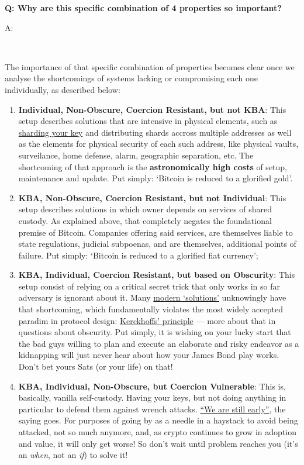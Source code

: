 \documentclass[12pt,a4paper]{article}
\newenvironment{question}[1]{%
  \vspace{0.8em}\noindent\textbf{Q: #1}\par
  \vspace{0.2em}\noindent\begin{itshape}A:\end{itshape}~%
}{\vspace{0.8em}}
\begin{document}
\begin{question}{Why are this specific combination of 4 properties so important?}
 The importance of that specific combination of properties becomes clear once we analyse the shortcomings of systems lacking or compromising each one individually, as described below:
 \begin{enumerate}
  \item \textbf{Individual, Non-Obscure, Coercion Resistant, but not KBA}: This setup describes solutions that are intensive in physical elements, such as \href{https://iancoleman.io/shamir39/}{sharding your key} and distributing shards accross multiple addresses as well as the elements for physical security of each such address, like physical vaults, surveilance, home defense, alarm, geographic separation, etc. The shortcoming of that approach is the \textbf{astronomically high costs} of setup, maintenance and update. Put simply: `Bitcoin is reduced to a glorified gold'.
  \item \textbf{KBA, Non-Obscure, Coercion Resistant, but not Individual}: This setup describes solutions in which owner depends on services of shared custody. As explained above, that completely negates the foundational premise of Bitcoin. Companies offering said services, are themselves liable to state regulations, judicial subpoenas, and are themselves, additional points of failure. Put simply: `Bitcoin is reduced to a glorified fiat currency';
  \item \textbf{KBA, Individual, Coercion Resistant, but based on Obscurity}: This setup consist of relying on a critical secret trick that only works in so far adversary is ignorant about it. Many \href{https://rewindbitcoin.com/}{modern `solutions'} unknowingly have that shortcoming, which fundamentally violates the most widely accepted paradim in protocol design: \href{https://en.wikipedia.org/wiki/Kerckhoffs's_principle}{Kerckhoffs' principle} --- more about that in questions about obscurity. Put simply, it is wishing on your lucky start that the bad guys willing to plan and execute an elaborate and risky endeavor as a kidnapping will just never hear about how your James Bond play works. Don't bet yours Sats (or your life) on that!
  \item \textbf{KBA, Individual, Non-Obscure, but Coercion Vulnerable}: This is, basically, vanilla self-custody. Having your keys, but not doing anything in particular to defend them against wrench attacks. \href{https://duckduckgo.com/?q=\%22we+are+still+early\%22+bitcoin&t=brave&ia=web}{``We are still early''}, the saying goes. For purposes of going by as a needle in a haystack to avoid being attacked, not so much anymore, and, as crypto continues to grow in adoption and value, it will only get worse! So don't wait until problem reaches you (it's an \textit{when}, not an \textit{if}) to solve it!

\end{enumerate}
\end{question}
\end{document}
